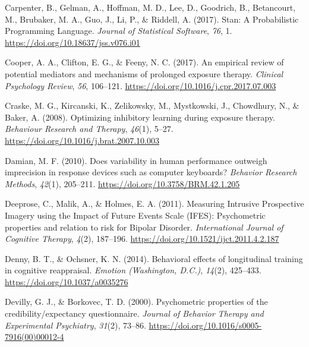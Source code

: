 \documentclass[
  man,floatsintext]{apa7}
\newlength{\cslhangindent}
\newlength{\cslentryspacingunit} %
\newenvironment{CSLReferences}[2] %
 {%
  \setlength{\parindent}{0pt}
  \ifodd #1
  \let\oldpar\par
  \def\par{\hangindent=\cslhangindent\oldpar}
  \fi
  \setlength{\parskip}{#2\cslentryspacingunit}
 }%
 {}
\begin{document}
\begin{CSLReferences}{1}{0}
\leavevmode{}%
Carpenter, B., Gelman, A., Hoffman, M. D., Lee, D., Goodrich, B., Betancourt, M., Brubaker, M. A., Guo, J., Li, P., \& Riddell, A. (2017). Stan: A Probabilistic Programming Language. \emph{Journal of Statistical Software}, \emph{76}, 1. \url{https://doi.org/10.18637/jss.v076.i01}

\leavevmode{}%
Cooper, A. A., Clifton, E. G., \& Feeny, N. C. (2017). An empirical review of potential mediators and mechanisms of prolonged exposure therapy. \emph{Clinical Psychology Review}, \emph{56}, 106--121. \url{https://doi.org/10.1016/j.cpr.2017.07.003}

\leavevmode{}%
Craske, M. G., Kircanski, K., Zelikowsky, M., Mystkowski, J., Chowdhury, N., \& Baker, A. (2008). Optimizing inhibitory learning during exposure therapy. \emph{Behaviour Research and Therapy}, \emph{46}(1), 5--27. \url{https://doi.org/10.1016/j.brat.2007.10.003}

\leavevmode{}%
Damian, M. F. (2010). Does variability in human performance outweigh imprecision in response devices such as computer keyboards? \emph{Behavior Research Methods}, \emph{42}(1), 205--211. \url{https://doi.org/10.3758/BRM.42.1.205}

\leavevmode{}%
Deeprose, C., Malik, A., \& Holmes, E. A. (2011). Measuring Intrusive Prospective Imagery using the Impact of Future Events Scale (IFES): Psychometric properties and relation to risk for Bipolar Disorder. \emph{International Journal of Cognitive Therapy}, \emph{4}(2), 187--196. \url{https://doi.org/10.1521/ijct.2011.4.2.187}

\leavevmode{}%
Denny, B. T., \& Ochsner, K. N. (2014). Behavioral effects of longitudinal training in cognitive reappraisal. \emph{Emotion (Washington, D.C.)}, \emph{14}(2), 425--433. \url{https://doi.org/10.1037/a0035276}

\leavevmode{}%
Devilly, G. J., \& Borkovec, T. D. (2000). Psychometric properties of the credibility/expectancy questionnaire. \emph{Journal of Behavior Therapy and Experimental Psychiatry}, \emph{31}(2), 73--86. \url{https://doi.org/10.1016/s0005-7916(00)00012-4}


\end{CSLReferences}
\end{document}
